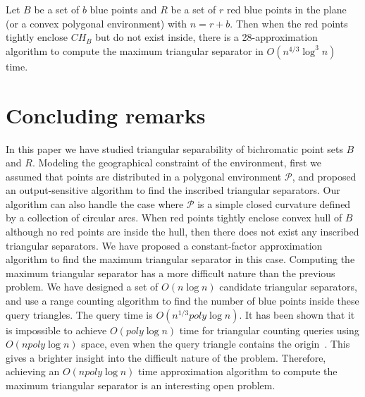 \documentclass[a4paper,UKenglish]{lipics-v2018}
\theoremstyle{definition}
\begin{document}
\begin{theorem}
Let $B$ be a set of $b$ blue points and  $R$ be a set of $r$ red blue points in the plane (or a convex polygonal environment) with $n = r+b$. Then when the red points  tightly enclose $CH_B$ but do not exist inside, there is a 28-approximation algorithm to compute the maximum triangular separator in $O(n^{4/3} \log^3 n)$ time.
\end{theorem}

\section{Concluding remarks}
In this paper we have studied triangular separability of bichromatic point sets $B$ and $R$. Modeling the geographical constraint of the environment, first we assumed that points are distributed in a polygonal environment $\mathcal P$, and proposed an output-sensitive algorithm to find the inscribed triangular separators. Our algorithm can also handle the case where $\mathcal P$ is a simple closed curvature defined by a collection of circular arcs. When red points tightly enclose convex hull of $B$ although no red points are inside the hull, then there does not exist any inscribed triangular separators. We have proposed a constant-factor approximation algorithm to find the maximum triangular separator in this case. Computing the maximum triangular separator has a more difficult nature than the previous problem. We have designed a set of $O(n \log n)$ candidate triangular separators, and use a range counting algorithm to find the number of blue points inside these query triangles. The query time is  $O(n^{1/3} poly\log n)$. It has been shown that it  is impossible to achieve $O(poly\log n)$ time for triangular counting queries using $O(n poly\log n)$ space, even when the query triangle contains the origin~\cite{tri-query,tri-thesis}. This gives a brighter insight into the difficult nature of the problem. Therefore, achieving an $O(n poly\log n)$ time approximation algorithm to compute the maximum triangular separator is an interesting open problem.



{}
  
\end{document}
